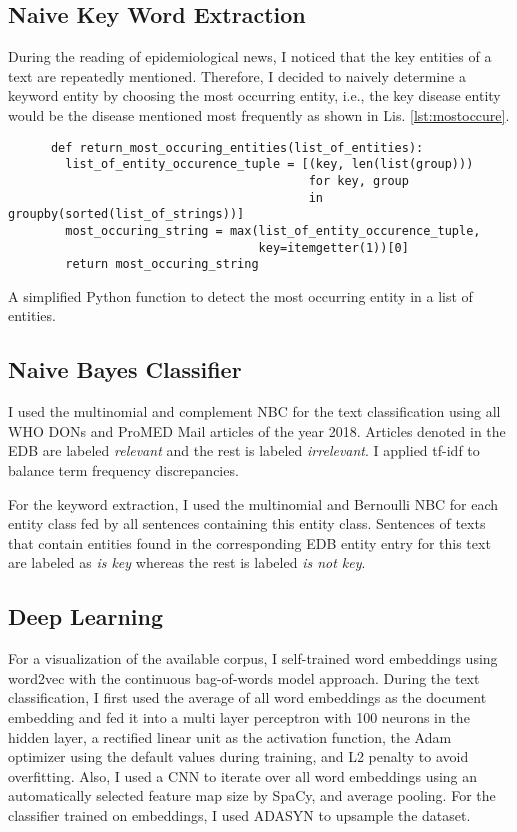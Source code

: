 \subsection{Naive Key Word Extraction}
  During the reading of epidemiological news, I noticed that the key entities of a text are repeatedly mentioned.
  Therefore, I decided to naively determine a keyword entity by choosing the most occurring entity, i.e., the key disease entity would be the disease mentioned most frequently as shown in Lis. \ref{lst:mostoccure}.
  \begin{listing}[h!]
    \begin{verbatim}
      def return_most_occuring_entities(list_of_entities):
        list_of_entity_occurence_tuple = [(key, len(list(group)))
                                          for key, group
                                          in groupby(sorted(list_of_strings))]
        most_occuring_string = max(list_of_entity_occurence_tuple,
                                   key=itemgetter(1))[0]
        return most_occuring_string
    \end{verbatim}
    \caption{A simplified Python function to detect the most occurring entity in a list of entities.}
    \label{lst:mostoccure}
  \end{listing}

\subsection{Naive Bayes Classifier}\label{iskey}
  I used the multinomial and complement NBC for the text classification using all WHO DONs and ProMED Mail articles of the year 2018.
  Articles denoted in the EDB are labeled \textsl{relevant} and the rest is labeled \textsl{irrelevant}.
  I applied tf-idf to balance term frequency discrepancies.

  For the keyword extraction, I used the multinomial and Bernoulli NBC for each entity class fed by all sentences containing this entity class.
  Sentences of texts that contain entities found in the corresponding EDB entity entry for this text are labeled as \textsl{is key} whereas the rest is labeled \textsl{is not key}.

\subsection{Deep Learning}
  For a visualization of the available corpus, I self-trained word embeddings using word2vec with the continuous bag-of-words model approach.
  During the text classification, I first used the average of all word embeddings as the document embedding and fed it into a multi layer perceptron with 100 neurons in the hidden layer, a rectified linear unit as the activation function, the Adam optimizer using the default values during training, and L2 penalty to avoid overfitting.
  Also, I used a CNN to iterate over all word embeddings using an automatically selected feature map size by SpaCy, and average pooling.
  For the classifier trained on embeddings, I used ADASYN to upsample the dataset.

